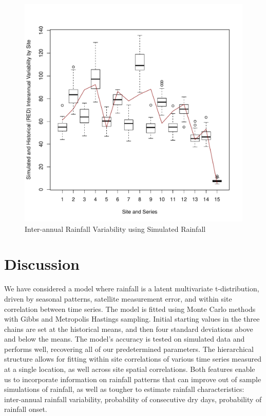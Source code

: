 \documentclass[11pt]{article}
\begin{document}
\begin{figure}[htbp]
\caption{Inter-annual Rainfall Variability using Simulated Rainfall}
\begin{center}
\includegraphics[width=5.0in]{Interannual.pdf}
\end{center}
\end{figure}

\newpage

\section{Discussion}\label{sec:discussion}

We have considered a model where rainfall is a latent multivariate t-distribution, driven by seasonal patterns, satellite measurement error, and within site correlation between time series. The model is fitted using Monte Carlo methods with Gibbs and Metropolis Hastings sampling. Initial starting values in the three chains are set at the historical means, and then four standard deviations above and below the means. The model's accuracy is tested on simulated data and performs well, recovering all of our predetermined parameters. The hierarchical structure allows for fitting within site correlations of various time series measured at a single location, as well across site spatial correlations. Both features enable us to incorporate information on rainfall patterns that can improve out of sample simulations of rainfall, as well as tougher to estimate rainfall characteristics: inter-annual rainfall variability, probability of consecutive dry days, probability of rainfall onset.
\end{document}
